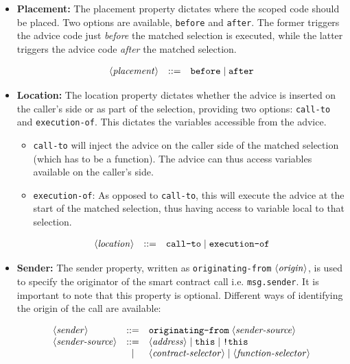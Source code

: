 \documentclass{article}
\newcommand{\variable}[1]{\ensuremath{\langle\textrm{\textit{#1}}\rangle}}
\begin{document}
\begin{itemize}
    \item \textbf{Placement:}
    The placement property dictates where the scoped code should be placed. Two options are available, \texttt{before} and \texttt{after}. The former triggers the advice code just \emph{before} the matched selection is executed, while the latter 
    triggers the advice code \emph{after} the matched selection. 
    
    \[\begin{array}{lcl}
        \variable{placement} & ::= & \texttt{before} \mid \texttt{after}
    \end{array}\]

    \item \textbf{Location:}
    The location property dictates whether the advice is inserted on the caller's side or as part of the selection, providing two options:  \texttt{call-to} and \texttt{execution-of}. This dictates the variables accessible from the advice.
    \begin{itemize}
	    \item \texttt{call-to} will inject the advice on the caller side of the matched selection (which has to be a function). The advice can thus access variables available on the caller's side. 
	    \item \texttt{execution-of}: As opposed to \texttt{call-to}, this will execute the advice at the start of the matched selection, thus having access to variable local to that selection.
    \end{itemize}

    \[\begin{array}{lcl}
        \variable{location} & ::= & \texttt{call-to} \mid \texttt{execution-of}
    \end{array}\]

    \item\textbf{Sender:} The sender property, written as \texttt{originating-from} $\variable{origin}$, is used to specify the originator of the smart contract call i.e. \texttt{msg.sender}. It is important to note that this property is optional. Different ways of identifying the origin of the call are available:
    
    \[\begin{array}{lcl}
        \variable{sender} 
        & ::=  & \texttt{originating-from}\; \variable{sender-source} \\
        \variable{sender-source} 
        & ::=  & \variable{address} \mid   \texttt{this} \mid \texttt{!this} \\
        & \mid & \variable{contract-selector} \mid \variable{function-selector} 
    \end{array}\]


\end{itemize}
\end{document}
